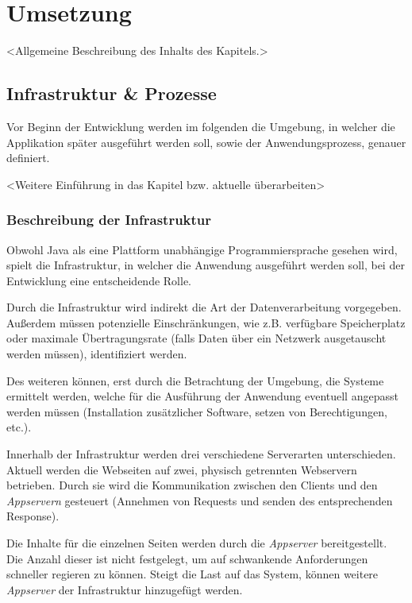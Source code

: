 
\chapter{Umsetzung}\label{cha:Umsetzung}
<Allgemeine Beschreibung des Inhalts des Kapitels.>

\section{Infrastruktur \& Prozesse}
Vor Beginn der Entwicklung werden im folgenden die Umgebung, in welcher die Applikation später ausgeführt werden soll, sowie der Anwendungsprozess, genauer definiert. 

<Weitere Einführung in das Kapitel bzw. aktuelle überarbeiten>

\subsection{Beschreibung der Infrastruktur}\label{subsec:Infrastruktur}
Obwohl Java als eine Plattform unabhängige Programmiersprache gesehen wird, spielt die Infrastruktur, in welcher die Anwendung ausgeführt werden soll, bei der Entwicklung eine entscheidende Rolle.

Durch die Infrastruktur wird indirekt die Art der Datenverarbeitung vorgegeben. Außerdem müssen potenzielle Einschränkungen, wie z.B. verfügbare Speicherplatz oder maximale Übertragungsrate (falls Daten über ein Netzwerk ausgetauscht werden müssen), identifiziert werden.

Des weiteren können, erst durch die Betrachtung der Umgebung, die Systeme ermittelt werden, welche für die Ausführung der Anwendung eventuell angepasst werden müssen (Installation zusätzlicher Software, setzen von Berechtigungen, etc.).

Innerhalb der Infrastruktur werden drei verschiedene Serverarten unterschieden. Aktuell werden die Webseiten auf zwei, physisch getrennten Webservern betrieben. Durch sie wird die Kommunikation zwischen den Clients und den \textit{Appservern} gesteuert (Annehmen von Requests und senden des entsprechenden Response).

Die Inhalte für die einzelnen Seiten werden durch die \textit{Appserver} bereitgestellt. Die Anzahl dieser ist nicht festgelegt, um auf schwankende Anforderungen schneller regieren zu können. Steigt die Last auf das System, können weitere \textit{Appserver} der Infrastruktur hinzugefügt werden.

